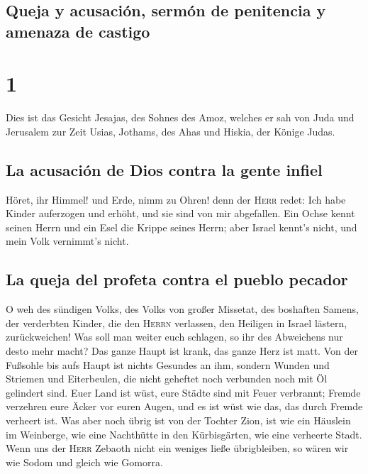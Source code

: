 \hypertarget{queja-y-acusaciuxf3n-sermuxf3n-de-penitencia-y-amenaza-de-castigo}{%
\subsection{Queja y acusación, sermón de penitencia y amenaza de
castigo}\label{queja-y-acusaciuxf3n-sermuxf3n-de-penitencia-y-amenaza-de-castigo}}

\hypertarget{section}{%
\section{1}\label{section}}

 Dies ist das Gesicht Jesajas, des Sohnes des Amoz,
welches er sah von Juda und Jerusalem zur Zeit Usias, Jothams, des Ahas
und Hiskia, der Könige Judas.

\hypertarget{la-acusaciuxf3n-de-dios-contra-la-gente-infiel}{%
\subsection{La acusación de Dios contra la gente
infiel}\label{la-acusaciuxf3n-de-dios-contra-la-gente-infiel}}

 Höret, ihr Himmel! und Erde, nimm zu Ohren! denn der
\textsc{Herr} redet: Ich habe Kinder auferzogen und erhöht, und sie sind
von mir abgefallen.  Ein Ochse kennt seinen Herrn und ein
Esel die Krippe seines Herrn; aber Israel kennt's nicht, und mein Volk
vernimmt's nicht.

\hypertarget{la-queja-del-profeta-contra-el-pueblo-pecador}{%
\subsection{La queja del profeta contra el pueblo
pecador}\label{la-queja-del-profeta-contra-el-pueblo-pecador}}

 O weh des sündigen Volks, des Volks von großer Missetat,
des boshaften Samens, der verderbten Kinder, die den \textsc{Herrn}
verlassen, den Heiligen in Israel lästern, zurückweichen! 
Was soll man weiter euch schlagen, so ihr des Abweichens nur desto mehr
macht? Das ganze Haupt ist krank, das ganze Herz ist matt.
 Von der Fußsohle bis aufs Haupt ist nichts Gesundes an
ihm, sondern Wunden und Striemen und Eiterbeulen, die nicht geheftet
noch verbunden noch mit Öl gelindert sind.  Euer Land ist
wüst, eure Städte sind mit Feuer verbrannt; Fremde verzehren eure Äcker
vor euren Augen, und es ist wüst wie das, das durch Fremde verheert ist.
 Was aber noch übrig ist von der Tochter Zion, ist wie ein
Häuslein im Weinberge, wie eine Nachthütte in den Kürbisgärten, wie eine
verheerte Stadt.  Wenn uns der \textsc{Herr} Zebaoth nicht
ein weniges ließe übrigbleiben, so wären wir wie Sodom und gleich wie
Gomorra.

